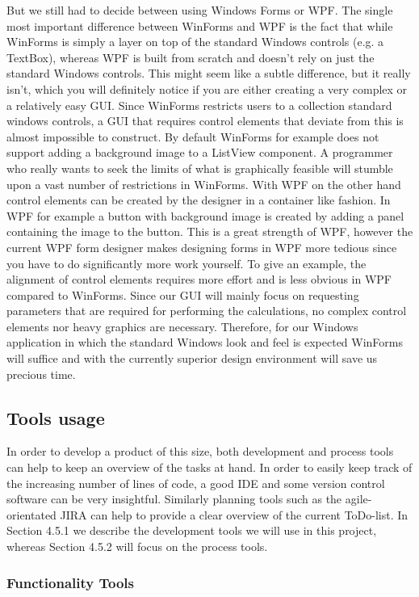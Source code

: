 But we still had to decide between using Windows Forms or WPF. The single most important difference between WinForms and WPF is the fact that while WinForms is simply a layer on top of the standard Windows controls (e.g. a TextBox), whereas WPF is built from scratch and doesn't rely on just the standard Windows controls. This might seem like a subtle difference, but it really isn't, which you will definitely notice if you are either creating a very complex or a relatively easy GUI. Since WinForms restricts users to a collection standard windows controls, a GUI that requires control elements that deviate from this is almost impossible to construct. By default WinForms for example does not support adding a background image to a ListView component. A programmer who really wants to seek the limits of what is graphically feasible will stumble upon a vast number of restrictions in WinForms. With WPF on the other hand control elements can be created by the designer in a container like fashion. In WPF for example a button with background image is created by adding a panel containing the image to the button. This is a great strength of WPF, however the current WPF form designer makes designing forms in WPF more tedious since you have to do significantly more work yourself. To give an example, the alignment of control elements requires more effort and is less obvious in WPF compared to WinForms. Since our GUI will mainly focus on requesting parameters that are required for performing the calculations, no complex control elements nor heavy graphics are necessary. Therefore, for our Windows application in which the standard Windows look and feel is expected WinForms will suffice and with the currently superior design environment will save us precious time.

\subsection{Tools usage}
In order to develop a product of this size, both development and process tools can help to keep an overview of the tasks at hand. In order to easily keep track of the increasing number of lines of code, a good IDE and some version control software can be very insightful. Similarly planning tools such as the agile-orientated JIRA can help to provide a clear overview of the current ToDo-list. In Section 4.5.1 we describe the development tools we will use in this project, whereas Section 4.5.2 will focus on the process tools.

\subsubsection{Functionality Tools}

